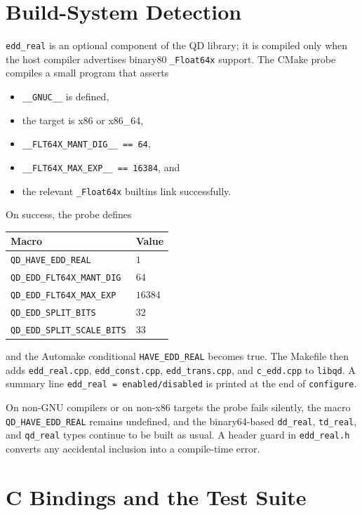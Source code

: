 \documentclass[11pt,a4paper]{article}
\begin{document}
\section{Build-System Detection}
\label{sec:build}

\texttt{edd\_real} is an optional component of the QD library; it
is compiled only when the host compiler advertises binary80
\texttt{\_Float64x} support.  The CMake probe
compiles a small program that asserts
\begin{itemize}
  \item \verb|__GNUC__| is defined,
  \item the target is x86 or x86\_64,
  \item \verb|__FLT64X_MANT_DIG__ == 64|,
  \item \verb|__FLT64X_MAX_EXP__ == 16384|, and
  \item the relevant \texttt{\_Float64x} builtins link successfully.
\end{itemize}
On success, the probe defines
\begin{center}
\begin{tabular}{ll}
\toprule
Macro & Value \\
\midrule
\texttt{QD\_HAVE\_EDD\_REAL}          & $1$ \\
\texttt{QD\_EDD\_FLT64X\_MANT\_DIG}   & $64$ \\
\texttt{QD\_EDD\_FLT64X\_MAX\_EXP}    & $16384$ \\
\texttt{QD\_EDD\_SPLIT\_BITS}         & $32$ \\
\texttt{QD\_EDD\_SPLIT\_SCALE\_BITS}  & $33$ \\
\bottomrule
\end{tabular}
\end{center}
and the Automake conditional \texttt{HAVE\_EDD\_REAL} becomes
true.  The Makefile then adds \texttt{edd\_real.cpp},
\texttt{edd\_const.cpp}, \texttt{edd\_trans.cpp}, and
\texttt{c\_edd.cpp} to \texttt{libqd}.  A summary line
\texttt{edd\_real = enabled/disabled} is printed at the end of
\texttt{configure}.

On non-GNU compilers or on non-x86 targets the probe fails
silently, the macro \texttt{QD\_HAVE\_EDD\_REAL} remains
undefined, and the binary64-based \texttt{dd\_real},
\texttt{td\_real}, and \texttt{qd\_real} types continue to be
built as usual.  A header guard in \texttt{edd\_real.h} converts
any accidental inclusion into a compile-time error.

\section{C Bindings and the Test Suite}
\label{sec:test}
\end{document}
